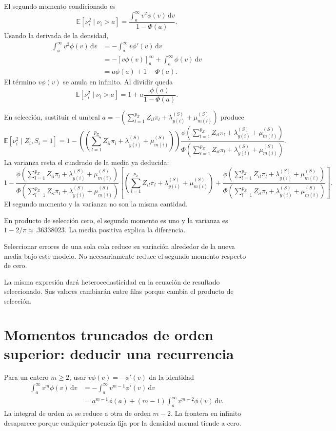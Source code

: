 \documentclass[11pt,a4paper]{article}
\newcommand{\E}{\mathbb E}
\newcommand{\dd}{\,\mathrm d}
\begin{document}
El segundo momento condicionado es
\[
\E[\nu_i^2\mid\nu_i>a]
=\frac{\int_a^\infty v^2\phi(v)\dd v}
{1-\Phi(a)}.
\]
Usando la derivada de la densidad,
\[
\begin{aligned}
\int_a^\infty v^2\phi(v)\dd v
&=-\int_a^\infty v\phi'(v)\dd v\\
&=-[v\phi(v)]_a^\infty
+\int_a^\infty\phi(v)\dd v\\
&=a\phi(a)+1-\Phi(a).
\end{aligned}
\]
El término \(v\phi(v)\) se anula
en infinito.
Al dividir queda
\[
\E[\nu_i^2\mid\nu_i>a]
=1+a\frac{\phi(a)}{1-\Phi(a)}.
\]

En selección, sustituir el umbral
\(a=-\left(\sum_{l=1}^{p_Z}Z_{il}\pi_l+\lambda_{y(i)}^{(S)}+\mu_{m(i)}^{(S)}\right)\) produce
\[
\E[\nu_i^2\mid Z_i,S_i=1]
=1-\left(\left(\sum_{l=1}^{p_Z}Z_{il}\pi_l+\lambda_{y(i)}^{(S)}+\mu_{m(i)}^{(S)}\right)\right)
\frac{\phi(\sum_{l=1}^{p_Z}Z_{il}\pi_l+\lambda_{y(i)}^{(S)}+\mu_{m(i)}^{(S)})}
{\Phi(\sum_{l=1}^{p_Z}Z_{il}\pi_l+\lambda_{y(i)}^{(S)}+\mu_{m(i)}^{(S)})}.
\]
La varianza resta el cuadrado
de la media ya deducida:
\[
\boxed{
1-\frac{\phi(\sum_{l=1}^{p_Z}Z_{il}\pi_l+\lambda_{y(i)}^{(S)}+\mu_{m(i)}^{(S)})}
{\Phi(\sum_{l=1}^{p_Z}Z_{il}\pi_l+\lambda_{y(i)}^{(S)}+\mu_{m(i)}^{(S)})}
\left[
\left(\sum_{l=1}^{p_Z}Z_{il}\pi_l+\lambda_{y(i)}^{(S)}+\mu_{m(i)}^{(S)}\right)
+\frac{\phi(\sum_{l=1}^{p_Z}Z_{il}\pi_l+\lambda_{y(i)}^{(S)}+\mu_{m(i)}^{(S)})}
{\Phi(\sum_{l=1}^{p_Z}Z_{il}\pi_l+\lambda_{y(i)}^{(S)}+\mu_{m(i)}^{(S)})}
\right]}.
\]
El segundo momento y la varianza
no son la misma cantidad.

\begin{ejemplo}[Seminormal]
En producto de selección cero,
el segundo momento es uno
y la varianza es \(1-2/\pi\approx.36338023\).
La media positiva explica la diferencia.
\end{ejemplo}
Seleccionar errores de una sola cola
reduce su variación alrededor de
la nueva media bajo este modelo.
No necesariamente reduce el segundo
momento respecto de cero.

La misma expresión dará
heterocedasticidad en la ecuación
de resultado seleccionado.
Sus valores cambiarán entre filas
porque cambia el producto de selección.


\clearpage
\section{Momentos truncados de orden superior: deducir una recurrencia}

Para un entero \(m\ge2\),
usar \(v\phi(v)=-\phi'(v)\)
da la identidad
\[
\begin{aligned}
\int_a^\infty v^m\phi(v)\dd v
&=-\int_a^\infty v^{m-1}\phi'(v)\dd v\\
&=a^{m-1}\phi(a)
+(m-1)\int_a^\infty v^{m-2}\phi(v)\dd v.
\end{aligned}
\]
La integral de orden \(m\) se reduce
a otra de orden \(m-2\).
La frontera en infinito desaparece
porque cualquier potencia fija
por la densidad normal tiende a cero.
\end{document}
